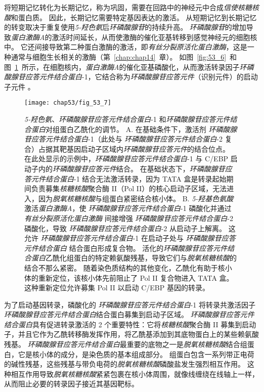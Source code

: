 将短期记忆转化为长期记忆，称为巩固，需要在回路中的神经元中合成\textit{信使核糖核酸}和蛋白质。
因此，长期记忆需要特定基因表达的激活。
从短期记忆到长期记忆的转变取决于重复使用\textit{5-羟色氨}后\textit{环磷酸腺苷}的持续升高。
\textit{环磷酸腺苷}的增加导致\textit{蛋白激酶A}的激活时间延长，从而使激酶的催化亚基转移到感觉神经元的细胞核中。
它还间接导致第二种蛋白激酶的激活，即\textit{有丝分裂原活化蛋白激酶}，这是一种通常与细胞生长相关的激酶（第~\ref{chap:chap14}~章）。
如图~\ref{fig:53_6}~和图~\ref{fig:53_7}~所示，在细胞核内，\textit{蛋白激酶A}的催化亚基磷酸化，从而激活转录因子\textit{环磷酸腺苷应答元件结合蛋白}-1，它结合称为\textit{环磷酸腺苷应答元件}（识别元件）的启动子元件 。


\begin{figure}[htbp]
	\centering
	\texttt{[image: chap53/fig\_53\_7]}
	\caption{\textit{5-羟色氨}、\textit{环磷酸腺苷应答元件结合蛋白}-1 和\textit{环磷酸腺苷应答元件结合蛋白}对组蛋白乙酰化的调节。 
		A. 在基础条件下，激活剂 \textit{环磷酸腺苷应答元件结合蛋白}-1（此处与 \textit{环磷酸腺苷应答元件结合蛋白}-2 复合）占据其靶基因启动子区域内\textit{环磷酸腺苷应答元件}的结合位点。
		在此处显示的示例中，\textit{环磷酸腺苷应答元件结合蛋白}-1 与 C/EBP 启动子内的\textit{环磷酸腺苷应答元件}结合。
		在基础状态下，\textit{环磷酸腺苷应答元件结合蛋白}-1 结合无法激活转录，因为 TATA 盒是转录起始期间负责募集\textit{核糖核酸}聚合酶 II（Pol II）的核心启动子区域，无法进入，因为\textit{脱氧核糖核酸}与组蛋白紧密结合核小体。
		B. \textit{5-羟基色氨酸}激活\textit{蛋白激酶A}，使 \textit{环磷酸腺苷应答元件结合蛋白}-1 磷酸化并通过 \textit{有丝分裂原活化蛋白激酶} 间接增强 \textit{环磷酸腺苷应答元件结合蛋白}-2 磷酸化，导致 \textit{环磷酸腺苷应答元件结合蛋白}-2 从启动子上解离。
		这允许 \textit{环磷酸腺苷应答元件结合蛋白}-1 在启动子处与 \textit{环磷酸腺苷应答元件结合蛋白} 结合蛋白形成复合物。
		活化的\textit{环磷酸腺苷应答元件结合蛋白}乙酰化组蛋白的特定赖氨酸残基，导致它们与\textit{脱氧核糖核酸}的结合不那么紧密。
		随着染色质结构的其他变化，乙酰化有助于核小体的重新定位，该核小体先前阻止了 Pol II 复合物进入 TATA 盒。
		这种重新定位允许募集 Pol II 以启动 C/EBP 基因的转录。}
	\label{fig:53_7}
\end{figure}


为了启动基因转录，磷酸化的 \textit{环磷酸腺苷应答元件结合蛋白}-1 将转录共激活因子\textit{环磷酸腺苷应答元件结合蛋白}结合蛋白募集到启动子区域。
\textit{环磷酸腺苷应答元件结合蛋白}具有促进转录激活的 2 个重要特性：它将\textit{核糖核酸}聚合酶 II 募集到启动子，并且它作为乙酰转移酶发挥作用，将乙酰基添加到其底物蛋白上的某些赖氨酸残基。
\textit{环磷酸腺苷应答元件结合蛋白}最重要的底物之一是\textit{脱氧核糖核酸}结合组蛋白，它是核小体的成分，是染色质的基本组成部分。
组蛋白包含一系列带正电荷的碱性残基，这些残基与带负电荷的\textit{脱氧核糖核酸}磷酸盐发生强烈相互作用。
这种相互作用导致\textit{脱氧核糖核酸}紧紧包裹在核小体周围，就像线缠绕在线轴上一样，从而阻止必要的转录因子接近其基因靶标。


